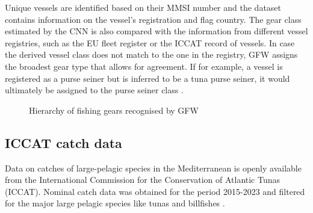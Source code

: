 Unique vessels are identified based on their MMSI number and the dataset contains information
on the vessel's registration and flag country. The gear class estimated by the CNN is also compared with the information
from different vessel registries, such as the EU fleet register or the ICCAT record of vessels. In case the derived vessel class
does not match to the one in the registry, GFW assigns the broadest gear type that allows for agreement. If for example,
a vessel is registered as a purse seiner but is inferred to be a tuna purse seiner, it would ultimately be assigned to the
purse seiner class .
\medskip
\begin{figure}[htbp]
\centering
{} %
\medskip
\caption{Hierarchy of fishing gears recognised by GFW}
\label{fig:vessel_classification}
\end{figure}

\subsection{ICCAT catch data}
Data on catches of large-pelagic species in the Mediterranean is openly available from the International Commission for the 
Conservation of Atlantic Tunas (ICCAT). Nominal catch data was obtained for the period 2015-2023 and filtered for the major 
large pelagic species like tunas and billfishes \citep{iccat_catches}.


